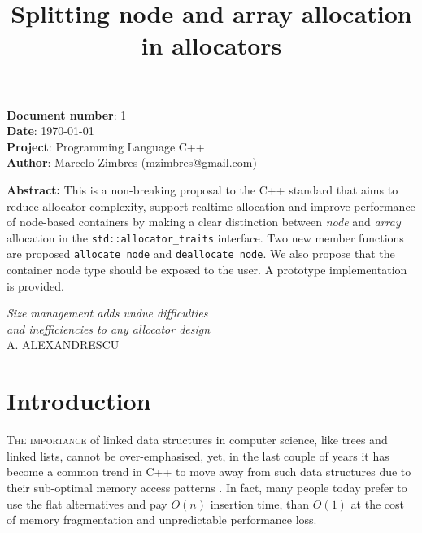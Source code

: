 \documentclass[11pt]{article}
\begin{document}
\date{}
\title{\bf Splitting node and array allocation in allocators}
\maketitle
\noindent
{\bf Document number}:  1 \\
{\bf Date}:  \today \\
{\bf Project}: Programming Language C++ \\
{\bf Author}: Marcelo Zimbres (\href{mailto:mzimbres@gmail.com}{mzimbres@gmail.com}) 

\vspace{1cm}

\noindent
{\bf Abstract: }This is a non-breaking proposal to the C++ standard that aims
to reduce allocator complexity, support realtime allocation and improve
performance of node-based containers by making a clear distinction between {\it node}
and {\it array} allocation in the \texttt{std::allocator\_traits} interface.
Two new member functions are proposed \texttt{allocate\_node} and
\texttt{deallocate\_node}. We also propose that the container node type should
be exposed to the user. A prototype implementation is provided.

\vfill
\begin{flushright}
\noindent
{\it Size management adds undue difficulties \\
     and inefficiencies to any allocator design} \\
A. ALEXANDRESCU \\
\medskip
{\it }
\end{flushright}
\medskip

\newpage
\tableofcontents

\newpage
\section{Introduction}
\textsc{The importance} of linked data structures in computer science, like
trees and linked lists, cannot be over-emphasised, yet, in the last couple of
years it has become a common trend in C++ to move away from such data
structures due to their sub-optimal memory access patterns \cite{middleditch,
chandler, meyers}.  In fact, many people today prefer to use the flat
alternatives and pay $O(n)$ insertion time, than $O(1)$ at the cost of memory
fragmentation and unpredictable performance loss.  
\end{document}

